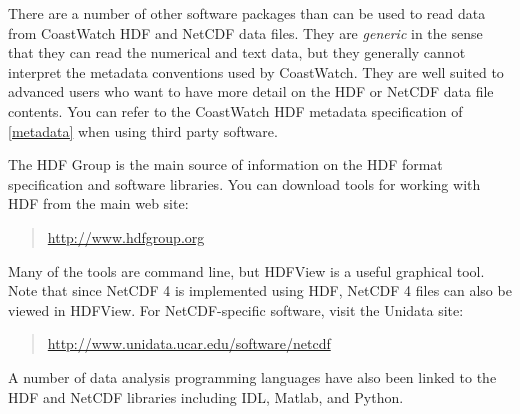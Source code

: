 There are a number of other software packages than can
be used to read data from CoastWatch HDF and NetCDF data files.  They are {\em
generic} in the sense that they can read the numerical and text data,
but they generally cannot interpret the metadata conventions used by CoastWatch.
They are well suited to advanced users who want to have more detail on
the HDF or NetCDF data file contents.  You can refer to the CoastWatch
HDF metadata specification of \autoref{metadata} when using third
party software.

The HDF Group is the main source of information
on the HDF format specification and software libraries.  You can
download tools for working with HDF from the main web site:
\begin{quote}
  \url{http://www.hdfgroup.org}
\end{quote} 
Many of the tools are command line, but HDFView is a useful graphical
tool.  Note that since NetCDF 4 is implemented using HDF, NetCDF 4 files can
also be viewed in HDFView.  For NetCDF-specific software, visit the Unidata site:
\begin{quote}
  \url{http://www.unidata.ucar.edu/software/netcdf}
\end{quote}

A number of data analysis programming languages have also been linked to the
HDF and NetCDF libraries including IDL, Matlab, and Python.

